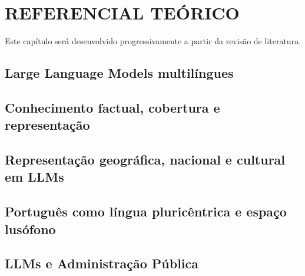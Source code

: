 \chapter{REFERENCIAL TEÓRICO}

Este capítulo será desenvolvido progressivamente a partir da revisão de literatura.

\section{Large Language Models multilíngues}

\section{Conhecimento factual, cobertura e representação}

\section{Representação geográfica, nacional e cultural em LLMs}

\section{Português como língua pluricêntrica e espaço lusófono}

\section{LLMs e Administração Pública}

